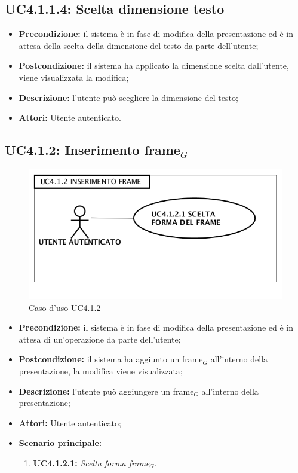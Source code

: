 \subsection{ UC4.1.1.4: Scelta dimensione testo}

\begin{itemize}
	\item \textbf{Precondizione:} il sistema è in fase di modifica della presentazione ed è in attesa della scelta della dimensione del testo da parte dell'utente;
	\item \textbf{Postcondizione:} il sistema ha applicato la dimensione scelta dall'utente, viene visualizzata la modifica;
	\item \textbf{Descrizione:} l'utente può scegliere la dimensione del testo;
	\item \textbf{Attori:} Utente autenticato.
\end{itemize}
\subsection{ UC4.1.2: Inserimento frame$_G$}

\begin{figure}[h]
	\begin{center}
	\includegraphics[scale=0.4]{diagram/UC4-1-2.png}
	\caption{Caso d'uso UC4.1.2}
	\end{center}
\end{figure}
\begin{itemize}
	\item \textbf{Precondizione:} il sistema è in fase di modifica della presentazione ed è in attesa di un'operazione da parte dell'utente;
	\item \textbf{Postcondizione:} il sistema ha aggiunto un frame$_G$ all'interno della presentazione, la modifica viene visualizzata;
	\item \textbf{Descrizione:} l'utente può aggiungere un frame$_G$ all'interno della presentazione;
	\item \textbf{Attori:} Utente autenticato;
	\item \textbf{Scenario principale:}
	\begin{enumerate}
		\item \textbf{ UC4.1.2.1:} \textit{ Scelta forma frame$_G$}.
	\end{enumerate}
\end{itemize}
